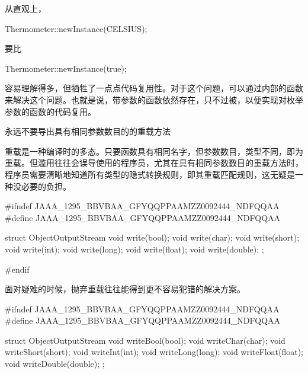 \begin{content}
从直观上，

\begin{leftbar}
\begin{c++}
Thermometer::newInstance(CELSIUS);
\end{c++}
\end{leftbar}

要比

\begin{leftbar}
\begin{c++}
Thermometer::newInstance(true);
\end{c++}
\end{leftbar}

容易理解得多，但牺牲了一点点代码复用性。对于这个问题，可以通过内部的函数来解决这个问题。也就是说，带参数的函数依然存在，只不过被，以便实现对枚举参数的函数的代码复用。

\begin{regulation}
永远不要导出具有相同参数数目的的重载方法
\end{regulation}

重载是一种编译时的多态。只要函数具有相同名字，但参数数目，类型不同，即为重载。但滥用往往会误导使用的程序员，尤其在具有相同参数数目的重载方法时，程序员需要清晰地知道所有类型的隐式转换规则，即其重载匹配规则，这无疑是一种没必要的负担。

\begin{leftbar}
\begin{c++}[caption={io/ObjectOutputStream.h}]
#ifndef JAAA_1295_BBVBAA_GFYQQPPAAMZZ0092444_NDFQQAA
#define JAAA_1295_BBVBAA_GFYQQPPAAMZZ0092444_NDFQQAA

struct ObjectOutputStream
{
    void write(bool);
    void write(char);
    void write(short);
    void write(int);
    void write(long);
    void write(float);
    void write(double);
};

#endif
\end{c++}
\end{leftbar}

面对疑难的时候，抛弃重载往往能得到更不容易犯错的解决方案。

\begin{leftbar}
\begin{c++}[caption={io/ObjectOutputStream.h}]
#ifndef JAAA_1295_BBVBAA_GFYQQPPAAMZZ0092444_NDFQQAA
#define JAAA_1295_BBVBAA_GFYQQPPAAMZZ0092444_NDFQQAA

struct ObjectOutputStream
{
    void writeBool(bool);
    void writeChar(char);
    void writeShort(short);
    void writeInt(int);
    void writeLong(long);
    void writeFloat(float);
    void writeDouble(double);
};


\end{c++}
\end{leftbar}
\end{content}
